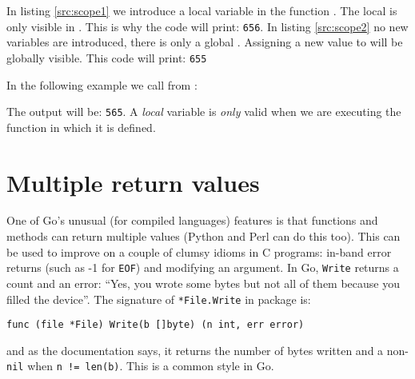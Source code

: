 \begin{minipage}{.5\textwidth}

\hfill
\vfill
\end{minipage}
\hfill
\begin{minipage}{.5\textwidth}

\hfill
\vfill
\end{minipage}

In listing \ref{src:scope1} we introduce a local variable 
in the function .
The local  is only visible in . This is
why the code will print: \texttt{656}.
In listing \ref{src:scope2} no new variables are introduced, there
is only a global .
Assigning a new value to  will be globally visible. This code will
print: \texttt{655}

In the following example we call  from :



The output will be: \texttt{565}. A \emph{local} variable is \emph{only}
valid when we are executing the function in which it is defined. 

\section{Multiple return values}
\label{sec:multiple return}
One of Go's unusual (for compiled languages) features is that functions and methods can return multiple
values (Python and Perl can do this too). This can be used to improve on a couple of 
clumsy idioms in C programs:
in-band error returns (such as -1 for \texttt{EOF}) and modifying an argument.
In Go, \lstinline{Write} returns a count and an
error: ``Yes, you wrote some bytes but not all of them because you filled the
device''. The signature of \lstinline{*File.Write} in package
 is:
\begin{lstlisting}
func (file *File) Write(b []byte) (n int, err error)
\end{lstlisting}
and as the documentation says, it returns the number of bytes written and a
non-\lstinline{nil}  when \lstinline{n != len(b)}. This is a common
style in Go.

